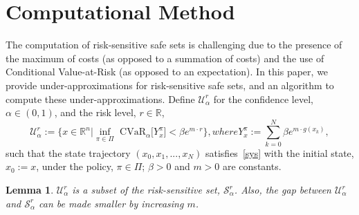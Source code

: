 \documentclass[letterpaper, 10 pt, conference]{ieeeconf}  %
\newtheorem{lemma}{Lemma}
\begin{document}
\section{Computational Method}\label{alg}
The computation of risk-sensitive safe sets is challenging due to the presence of the maximum of costs (as opposed to a summation of costs)
and the use of Conditional Value-at-Risk (as opposed to an expectation). In this paper, we provide under-approximations 
for risk-sensitive safe sets, and an algorithm to compute these under-approximations. Define $\mathcal{U}_\alpha^r$
for the confidence level, $\alpha \in (0,1)$, and the risk level, $r \in \mathbb{R}$,
\begin{subequations}\label{under}\begin{equation}
\mathcal{U}_\alpha^r := 
\Big\{x \in \mathbb{R}^n \Big| {\underset{\pi \in \Pi}\inf} \text{ CVaR}_\alpha \big[ Y_x^\pi \big] < \beta e^{m\cdot r} \Big\},
\end{equation}
where
\begin{equation}
Y_x^\pi := \overset{N}{\underset{k=0}\sum} \beta e^{m\cdot g(x_k)},
\end{equation}
\end{subequations}
such that the state trajectory $(x_0, x_1, ..., x_N)$
satisfies~\eqref{sys} with the initial state, $x_0 := x$, under the policy, $\pi \in \Pi$;
$\beta > 0$ and $m > 0$ are constants.
\begin{lemma}\label{lemma2}
$\mathcal{U}_\alpha^r$ is a subset of the risk-sensitive set, $\mathcal{S}_\alpha^r$. 
Also, the gap between $\mathcal{U}_\alpha^r$ and $\mathcal{S}_\alpha^r$ can be made smaller by increasing $m$.
\end{lemma}
\end{document}
